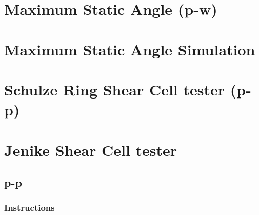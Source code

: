 \lipsum[1]

\section{Maximum Static Angle (p-w)}
\label{sec:msa}

\lipsum[1]

\section{Maximum Static Angle Simulation}
\label{sec:msasimulation}

\lipsum[1]

\section{Schulze Ring Shear Cell tester (p-p)}
\label{sec:SRSCT}

\lipsum[1]

\section{Jenike Shear Cell tester}
\label{sec:jsct}

\lipsum[1]

\subsection{p-p}
\label{subsec:JSCTpp}

\lipsum[2]

\subsubsection{Instructions}
\label{subsubsec:instructions}

